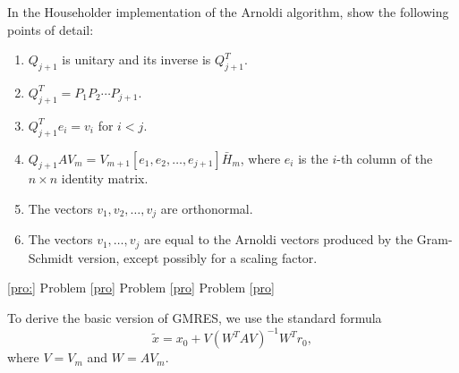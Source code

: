 \documentclass{ctexart}
\newif\ifpreface
\begin{document}
\large
\setlength{\baselineskip}{1.2em}
\ifpreface

\newgeometry{left=2cm,right=2cm,top=2cm,bottom=2cm}
\else
{}
\maketitle
\fi
\begin{problem}
  In the Householder implementation of the Arnoldi algorithm, show the following points of detail:
  \begin{enumerate}[label=(\alph*)]
    \item $Q_{j+1}$ is unitary and its inverse is $Q_{j+1}^{T}$.
    \item $Q_{j+1}^{T} = P_1 P_2 \cdots P_{j+1}$.
    \item $Q_{j+1}^{T} e_i = v_i$ for $i < j$.
    \item $Q_{j+1} A V_m = V_{m+1} [e_1, e_2, \ldots, e_{j+1}] \bar{H}_m$, where $e_i$ is the $i$-th column of the $n \times n$ identity matrix.
    \item The vectors $v_1, v_2, \ldots, v_j$ are orthonormal.
    \item The vectors $v_1, \ldots, v_j$ are equal to the Arnoldi vectors produced by the Gram-Schmidt version, except possibly for a scaling factor.
  \end{enumerate}
\end{problem}
\begin{solution}
  \ref{pro:}
  Problem \ref{pro}
  Problem \ref{pro}
  Problem \ref{pro}

\end{solution}

\begin{problem}
  To derive the basic version of GMRES, we use the standard formula
  \begin{equation} \label{eq:5.7}
    \tilde{x} = x_0 + V \left( W^{T} A V \right)^{-1} W^{T} r_0,
  \end{equation}
  where \( V = V_m \) and \( W = A V_m \).
\end{problem}
\end{document}
